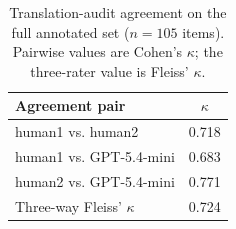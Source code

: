 \begin{table}[t]
\centering
\small
\begin{tabular}{lc}
\toprule
Agreement pair & $\kappa$ \\
\midrule
human1 vs. human2 & 0.718 \\
human1 vs. GPT-5.4-mini & 0.683 \\
human2 vs. GPT-5.4-mini & 0.771 \\
Three-way Fleiss' $\kappa$ & 0.724 \\
\bottomrule
\end{tabular}
\caption{Translation-audit agreement on the full annotated set ($n=105$ items). Pairwise values are Cohen's $\kappa$; the three-rater value is Fleiss' $\kappa$.}
\end{table}
